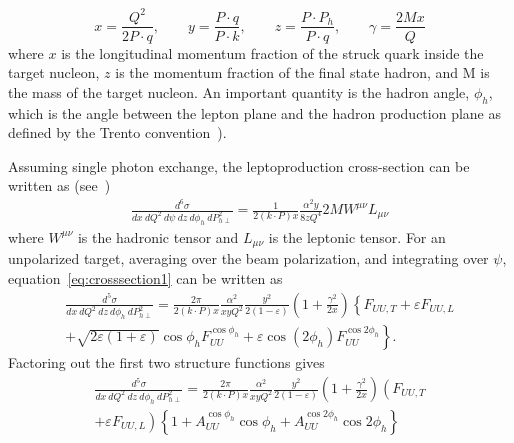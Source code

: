 \begin{equation}
\label{eq:momfracs}
x = \frac{Q^{2}}{2P \cdot q}
, \qquad
y = \frac{P \cdot q}{P \cdot k}
, \qquad
z = \frac{P \cdot P_{h}}{P \cdot q}
, \qquad
\gamma = \frac{2Mx}{Q}
\end{equation}
%
where $x$ is the longitudinal momentum fraction of the struck quark inside the target nucleon, $z$ is the momentum fraction of the final state hadron, and M is the mass of the target nucleon.
An important quantity is the hadron angle, $\phi_{h}$, which is the angle between the lepton plane and the hadron production plane as defined by the Trento convention~\cite{Bacchetta04}).

Assuming single photon exchange, the leptoproduction cross-section can be written as (see~\cite{Bacchetta07})
\begin{equation}
\label{eq:crosssection1}
\begin{split}
\frac{d^{6} \sigma}{dx\ dQ^2\ d \psi\ dz\ d \phi_{h}\ dP_{h \perp}^{2}} = \frac{1}{2(k\cdot P)x} \frac{\alpha^{2} y}{8zQ^{4}}2MW^{\mu \nu}L_{\mu \nu}
\end{split}
\end{equation}
where $W^{\mu \nu}$ is the hadronic tensor and $L_{\mu \nu}$ is the leptonic tensor.
For an unpolarized target, averaging over the beam polarization, and integrating over $\psi$, equation~\ref{eq:crosssection1} can be written as
\begin{equation}
\label{eq:crosssection3}
\begin{split}
\frac{d^{5} \sigma}{dx\ dQ^2\ dz\ d \phi_{h}\ dP_{h \perp}^{2}} = \frac{2\pi}{2(k\cdot P)x} \frac{\alpha^{2}}{xyQ^{2}} \frac{y^{2}}{2 \left( 1 - \varepsilon \right)} \left( 1 + \frac{\gamma^{2}}{2x} \right) \left\{ F_{UU,T} + \varepsilon F_{UU,L} \right.
\\
\left. + \sqrt{2 \varepsilon \left( 1 + \varepsilon \right)} \cos \phi_{h} F^{\cos \phi_{h}}_{UU} + \varepsilon \cos \left( 2 \phi_{h} \right) F_{UU}^{\cos2\phi_{h}} \right\}.
\end{split}
\end{equation}
Factoring out the first two structure functions gives
\begin{equation}
\label{eq:crosssection4}
\begin{split}
\frac{d^{5} \sigma}{dx\ dQ^2\ dz\ d \phi_{h}\ dP_{h \perp}^{2}} = \frac{2\pi}{2(k\cdot P)x} \frac{\alpha^{2}}{xyQ^{2}} \frac{y^{2}}{2 \left( 1 - \varepsilon \right)} \left( 1 + \frac{\gamma^{2}}{2x} \right) \left( F_{UU,T} \right.
\\
\left. + \varepsilon F_{UU,L} \right) \left\{ 1 + A^{\cos\phi_{h}}_{UU} \cos\phi_{h} + A^{\cos2\phi_{h}}_{UU} \cos2\phi_{h} \right\}
\end{split}
\end{equation}
